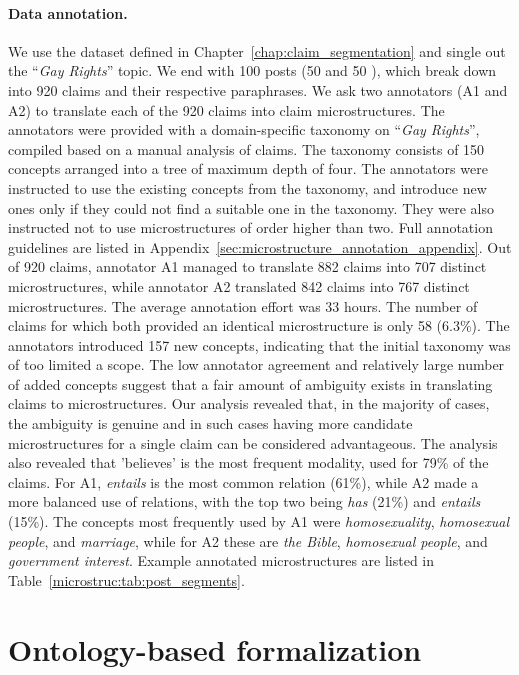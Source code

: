 \paragraph{Data annotation. }
We use the dataset defined in Chapter~\ref{chap:claim_segmentation}
and single out the ``\emph{Gay Rights}'' topic. We end with 100 
posts (50  and 50 ), which break down into 920 claims and their
respective paraphrases. We ask two annotators (A1 and A2) to translate each of 
the 920 claims into claim microstructures. The annotators were provided 
with a domain-specific taxonomy on ``\emph{Gay Rights}'', compiled 
based on a manual analysis of claims. The taxonomy consists of 150 concepts
arranged into a tree of maximum depth of four. The annotators
were instructed to use the existing concepts from the taxonomy, and
introduce new ones only if they could not find a suitable one in the
taxonomy. They were also instructed not to use microstructures of order higher 
than two. Full annotation guidelines are listed in
Appendix~\ref{sec:microstructure_annotation_appendix}.
Out of 920 claims, annotator A1 managed to translate 882 claims into 707
distinct microstructures, while annotator A2 translated 842 claims into
767 distinct microstructures. The average annotation effort was 33 hours. 
The number of claims for which both provided an identical microstructure is only
58 (6.3\%). The annotators introduced 157 new concepts, indicating that the initial 
taxonomy was of too limited a scope. The low annotator agreement and relatively 
large number of added concepts suggest that a fair amount of ambiguity exists
in translating claims to microstructures. Our analysis revealed that, in the majority
of cases, the ambiguity is genuine and in such cases having more candidate 
microstructures for a single claim can be considered advantageous. 
The analysis also revealed that 'believes' is the most frequent modality, used for
79\% of the claims. For A1, \emph{entails} is the most common relation (61\%), while
A2 made a more balanced use of relations, with the top two being \emph{has} (21\%)
and \emph{entails} (15\%). The concepts most frequently used by A1 were
\emph{homosexuality}, \emph{homosexual people}, and \emph{marriage}, while for A2
these are \emph{the Bible}, \emph{homosexual people}, and \emph{government interest}. 
Example annotated microstructures are listed in Table~\ref{microstruc:tab:post_segments}. 

\section{Ontology-based formalization}
\label{sec:ontology_formalization}

